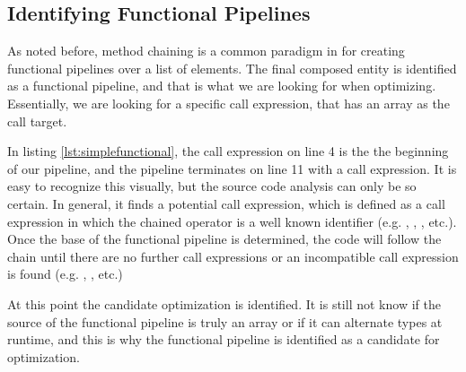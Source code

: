 \subsection{Identifying Functional Pipelines}

As noted before, method chaining is a common paradigm in \javascript for creating functional pipelines over a list of elements.  The final composed entity is identified as a functional pipeline, and that is what we are looking for when optimizing.  Essentially, we are looking for a specific call expression, that has an array as the call target. \\

\begin{minipage}{\linewidth}

\end{minipage}

In listing \ref{lst:simplefunctional}, the  call expression on line 4 is the the beginning of our pipeline, and the pipeline terminates on line 11 with a  call expression.  It is easy to recognize this visually, but the source code analysis can only be so certain.  In general, it finds a potential call expression, which is defined as a call expression in which the chained operator is a well known identifier (e.g. , , , etc.). Once the base of the functional pipeline is determined, the code will follow the chain until there are no further call expressions or an incompatible call expression is found (e.g. , , etc.)

At this point the candidate optimization is identified.  It is still not know if the source of the functional pipeline is truly an array or if it can alternate types at runtime, and this is why the functional pipeline  is identified as a candidate for optimization. 